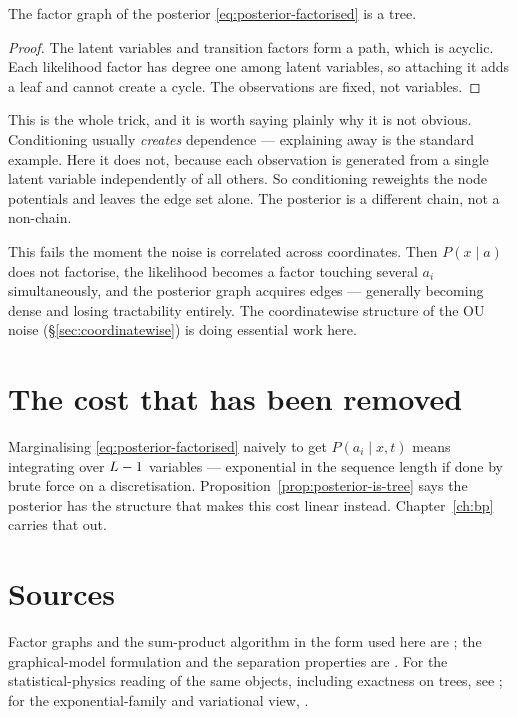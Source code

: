 \begin{proposition}
\label{prop:posterior-is-tree}
The factor graph of the posterior \eqref{eq:posterior-factorised} is a tree.
\end{proposition}

\begin{proof}
The latent variables and transition factors form a path, which is acyclic. Each likelihood
factor has degree one among latent variables, so attaching it adds a leaf and cannot create a
cycle. The observations are fixed, not variables.
\end{proof}

\begin{intuition}
This is the whole trick, and it is worth saying plainly why it is not obvious. Conditioning
usually \emph{creates} dependence --- explaining away is the standard example. Here it does
not, because each observation is generated from a single latent variable independently of all
others. So conditioning reweights the node potentials and leaves the edge set alone. The
posterior is a different chain, not a non-chain.
\end{intuition}

\begin{pitfall}
This fails the moment the noise is correlated across coordinates. Then
$P(x\mid a)$ does not factorise, the likelihood becomes a factor touching several $a_i$
simultaneously, and the posterior graph acquires edges --- generally becoming dense and
losing tractability entirely. The coordinatewise structure of the OU noise
(\S\ref{sec:coordinatewise}) is doing essential work here.
\end{pitfall}

\section{The cost that has been removed}

Marginalising \eqref{eq:posterior-factorised} naively to get $P(a_i\mid x,t)$ means
integrating over $L-1$ variables --- exponential in the sequence length if done by brute
force on a discretisation. Proposition~\ref{prop:posterior-is-tree} says the posterior has the
structure that makes this cost linear instead. Chapter~\ref{ch:bp} carries that out.

\section*{Sources}
Factor graphs and the sum-product algorithm in the form used here are \citet{kschischang2001};
the graphical-model formulation and the separation properties are \citet{pearl1988}. For the
statistical-physics reading of the same objects, including exactness on trees, see
\citet{mezard2009}; for the exponential-family and variational view, \citet{wainwright2008}.

